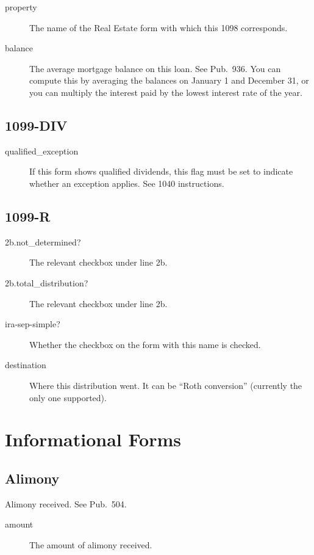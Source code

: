 \documentclass[12pt]{article}
\begin{document}
\begin{description}
\item[property] The name of the Real Estate form with which this 1098
corresponds.
\item[balance] The average mortgage balance on this loan. See Pub.\ 936.
You can compute this by averaging the balances on January 1 and December 31, or
you can multiply the interest paid by the lowest interest rate of the year.
\end{description}

\subsection{1099-DIV}

\begin{description}
\item[qualified\_exception] If this form shows qualified dividends, this flag
must be set to indicate whether an exception applies. See 1040 instructions.
\end{description}


\subsection{1099-R}

\begin{description}
\item[2b.not\_determined?] The relevant checkbox under line 2b.
\item[2b.total\_distribution?] The relevant checkbox under line 2b.
\item[ira-sep-simple?] Whether the checkbox on the form with this name is
checked.
\item[destination] Where this distribution went. It can be ``Roth conversion''
(currently the only one supported).
\end{description}


\section{Informational Forms}



\subsection{Alimony}

Alimony received. See Pub.\ 504.

\begin{description}
\item[amount] The amount of alimony received.
\end{description}
\end{document}
